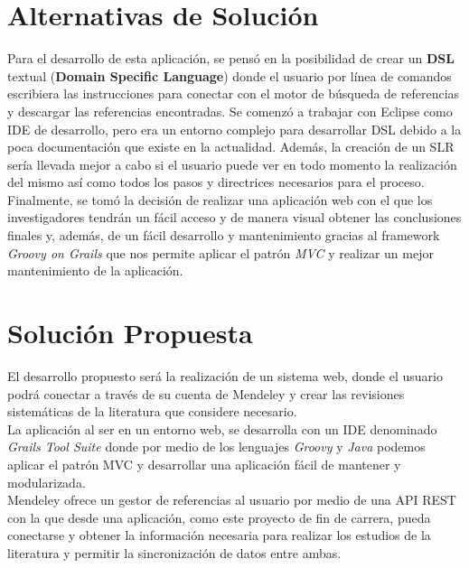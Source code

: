 \section{Alternativas de Solución}
Para el desarrollo de esta aplicación, se pensó en la posibilidad de crear un \textbf{DSL} textual (\textbf{Domain Specific Language}) donde el usuario por línea de comandos escribiera las instrucciones para conectar con el motor de búsqueda de referencias y descargar las referencias encontradas. Se comenzó a trabajar con Eclipse como IDE de desarrollo, pero era un entorno complejo para desarrollar DSL debido a la poca documentación que existe en la actualidad. Además, la creación de un SLR sería llevada mejor a cabo si el usuario puede ver en todo momento la realización del mismo así como todos los pasos y directrices necesarios para el proceso.\\

Finalmente, se tomó la decisión de realizar una aplicación web con el que los investigadores tendrán un fácil acceso y de manera visual obtener las conclusiones finales y, además, de un fácil desarrollo y mantenimiento gracias al framework \textit{Groovy on Grails} que nos permite aplicar el patrón \textit{MVC} y realizar un mejor mantenimiento de la aplicación.

\section{Solución Propuesta}
El desarrollo propuesto será la realización de un sistema web, donde el usuario podrá conectar a través de su cuenta de Mendeley y crear las revisiones sistemáticas de la literatura que considere necesario.\\

La aplicación al ser en un entorno web, se desarrolla con un IDE denominado \textit{Grails Tool Suite} donde por medio de los lenguajes \textit{Groovy} y \textit{Java} podemos aplicar el patrón MVC y desarrollar una aplicación fácil de mantener y modularizada.\\

Mendeley ofrece un gestor de referencias al usuario por medio de una API REST con la que desde una aplicación, como este proyecto de fin de carrera, pueda conectarse y obtener la información necesaria para realizar los estudios de la literatura y permitir la sincronización de datos entre ambas.\\